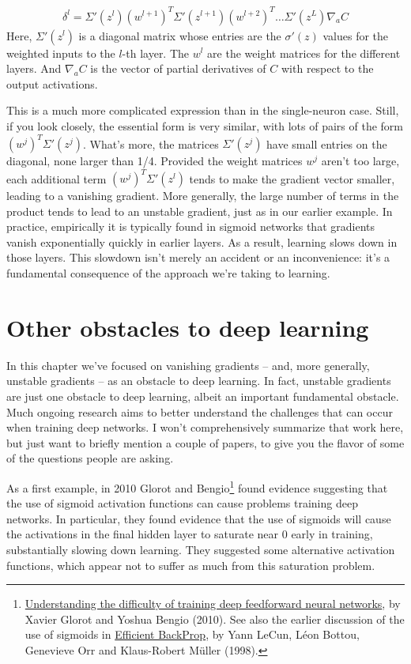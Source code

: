 \documentclass[a4paper,twoside,10pt]{book}
\begin{document}
\begin{align}
\delta^l = \Sigma'(z^l) (w^{l+1})^T \Sigma'(z^{l+1}) (w^{l+2})^T \ldots\Sigma'(z^L) \nabla_a C
\tag{124}\label{eq:124}
\end{align}
Here, $\Sigma'(z^l)$ is a diagonal matrix whose entries are the $\sigma'(z)$ values for the weighted inputs to the $l$-th layer. The $w^l$ are the weight matrices for the different layers. And $\nabla_aC$ is the vector of partial derivatives of $C$ with respect to the output activations.

This is a much more complicated expression than in the single-neuron case. Still, if you look closely, the essential form is very similar, with lots of pairs of the form $(w^j)^T\Sigma'(z^j)$. What's more, the matrices $\Sigma'(z^j)$ have small entries on the diagonal, none larger than 1/4. Provided the weight matrices $w^j$ aren't too large, each additional term $(w^j)^T\Sigma'(z^l)$ tends to make the gradient vector smaller, leading to a vanishing gradient. More generally, the large number of terms in the product tends to lead to an unstable gradient, just as in our earlier example. In practice, empirically it is typically found in sigmoid networks that gradients vanish exponentially quickly in earlier layers. As a result, learning slows down in those layers. This slowdown isn't merely an accident or an inconvenience: it's a fundamental consequence of the approach we're taking to learning.

\section{Other obstacles to deep learning}
In this chapter we've focused on vanishing gradients -- and, more generally, unstable gradients -- as an obstacle to deep learning. In fact, unstable gradients are just one obstacle to deep learning, albeit an important fundamental obstacle. Much ongoing research aims to better understand the challenges that can occur when training deep networks. I won't comprehensively summarize that work here, but just want to briefly mention a couple of papers, to give you the flavor of some of the questions people are asking.

As a first example, in 2010 Glorot and Bengio\footnote{\href{http://jmlr.org/proceedings/papers/v9/glorot10a/glorot10a.pdf}{Understanding the difficulty of training deep feedforward neural networks}, by Xavier Glorot and Yoshua Bengio (2010). See also the earlier discussion of the use of sigmoids in \href{http://yann.lecun.com/exdb/publis/pdf/lecun-98b.pdf}{Efficient BackProp}, by Yann LeCun, L\'eon Bottou, Genevieve Orr and Klaus-Robert M\"uller (1998).} found evidence suggesting that the use of sigmoid activation functions can cause problems training deep networks. In particular, they found evidence that the use of sigmoids will cause the activations in the final hidden layer to saturate near 0 early in training, substantially slowing down learning. They suggested some alternative activation functions, which appear not to suffer as much from this saturation problem.
\end{document}
